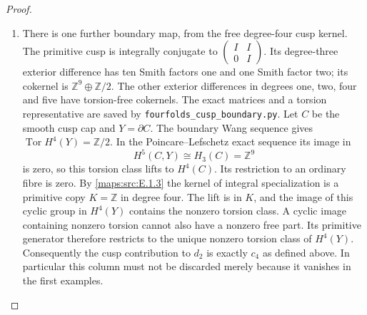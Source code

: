 \documentclass[11pt,a4paper]{article}
\theoremstyle{definition}
\begin{document}
\begin{proof}
\begin{enumerate}[label=\arabic*.]
\item There is one further boundary map, from the free
degree-four cusp kernel.
The primitive cusp is integrally conjugate to
$\left(\begin{smallmatrix}I&I\\0&I\end{smallmatrix}\right)$.
Its degree-three exterior difference has ten Smith
factors one and one Smith factor two; its cokernel is
$\mathbb Z^9\oplus\mathbb Z/2$.
The other exterior differences in degrees one, two,
four and five have torsion-free cokernels.
The exact matrices and a torsion representative are
saved by \texttt{fourfolds\_cusp\_boundary.py}.
Let $C$ be the smooth cusp cap and $Y=\partial C$.
The boundary Wang sequence gives
$\operatorname{Tor}H^4(Y)=\mathbb Z/2$.
In the Poincare--Lefschetz exact sequence its image in
\[
 H^5(C,Y)\cong H_3(C)=\mathbb Z^9
\]
is zero, so this torsion class lifts to $H^4(C)$.
Its restriction to an ordinary fibre is zero.
By \ref{maps:src:E.1.3} the kernel of integral specialization is
a primitive copy $K=\mathbb Z$ in degree four.
The lift is in $K$, and the image of this cyclic group
in $H^4(Y)$ contains the nonzero torsion class.
A cyclic image containing nonzero torsion cannot
also have a nonzero free part.
Its primitive generator therefore restricts to the
unique nonzero torsion class of $H^4(Y)$.
Consequently the cusp contribution to $d_2$ is
exactly $c_4$ as defined above.  In particular this
column must not be discarded merely because it
vanishes in the first examples.


\end{enumerate}
\end{proof}
\end{document}
